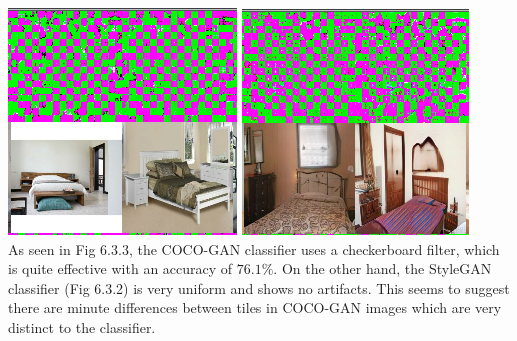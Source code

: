 \documentclass[10pt]{article}
\begin{document}
\begin{multicols*}{2}
        \includegraphics[scale=0.3]{smoothgrad/coco/real.png}
        \includegraphics[scale=0.3]{smoothgrad/coco/coco.png}\\
        As seen in Fig 6.3.3, the COCO-GAN classifier uses a checkerboard filter, which is quite effective with an accuracy of $76.1\%$.
        On the other hand, the StyleGAN classifier (Fig 6.3.2) is very uniform and shows no artifacts.
        This seems to suggest there are minute differences between tiles in COCO-GAN images which are very distinct to the classifier.
    \end{multicols*}
    \newpage
\end{document}
